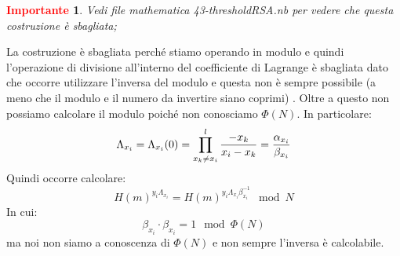 \documentclass{book}
\newtheorem*{Importante}{\textbf{\textcolor{red}{Importante}}}
\begin{document}
\begin{Importante}
	Vedi file mathematica 43-thresholdRSA.nb per vedere che questa costruzione è sbagliata;
\end{Importante}
La costruzione è sbagliata perché stiamo operando in modulo e quindi l'operazione di divisione all'interno del coefficiente di Lagrange è sbagliata dato che occorre utilizzare l'inversa del modulo e questa non è sempre possibile (a meno che il modulo e il numero da invertire siano coprimi) \@. Oltre a questo non possiamo calcolare il modulo poiché non conosciamo \(\Phi(N)\).
In particolare:\begin{equation*}
	\centering
	\Lambda_{x_{i}}=\Lambda_{x_{i}}(0)=\prod_{x_{k}\neq x_{i}}^{l}{\frac{-x_{k}}{x_{i}-x_{k}}}=\frac{\alpha_{x_{i}}}{\beta_{x_{i}}}
\end{equation*}
Quindi occorre calcolare:\begin{equation*}
	{H(m)}^{y_{i}\Lambda_{x_{i}}}={H(m)}^{y_{i}\Lambda_{x_{i}}\beta_{x_{i}}^{-1}}\mod{N}
\end{equation*}
In cui:\begin{equation*}
	\beta_{x_{i}}\cdot\beta_{x_{i}}=1\mod{\Phi(N)}
\end{equation*}
ma noi non siamo a conoscenza di \(\Phi(N)\) e non sempre l'inversa è calcolabile\@.
\end{document}
